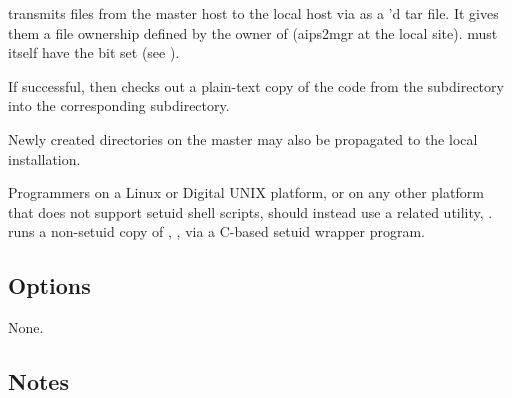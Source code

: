  transmits files from the master host to the local host via
 as a 'd tar file.  It gives them a file ownership
defined by the owner of  (aips2mgr at the local site).  
must itself have the  bit set (see ).
 
If successful,  then checks out a plain-text copy of the code from the
 subdirectory into the corresponding 
subdirectory.
 
Newly created directories on the master may also be propagated to the local
installation.

Programmers on a Linux or Digital UNIX platform, or on any other
platform that does not support setuid shell scripts, should instead use
a related utility, .   runs a non-setuid copy of
, , via a C-based setuid wrapper program.
 
\subsection*{Options}
 
None.

\subsection*{Notes}
 
